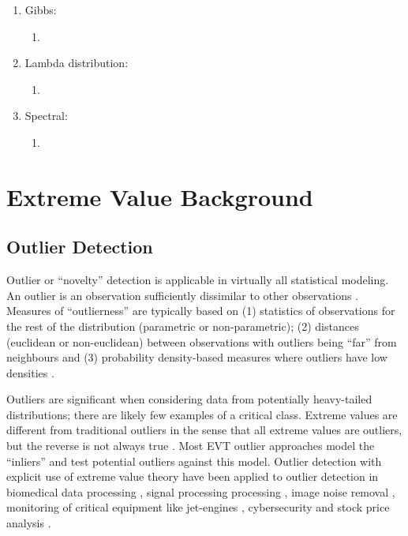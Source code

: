 \begin{enumerate}

    \item Gibbs:
          \begin{enumerate}
              \item \cite{barnett2015multivariate,silva2018multivariate,silva2018enhanced,arroyo2020iterative,madani2021enhanced}
          \end{enumerate}

    \item Lambda distribution:
          \begin{enumerate}
              \item \cite{hadavand2023spatial}
          \end{enumerate}

    \item Spectral:
          \begin{enumerate}
              \item \cite{lauzon2020calibration,lauzon2020sequential,lauzon2023joint}
          \end{enumerate}

\end{enumerate}


\FloatBarrier
\section{Extreme Value Background}
\label{sec:01evtreview}

\FloatBarrier
\subsection{Outlier Detection}
\label{subsec:01outlier}

Outlier or ``novelty'' detection is applicable in virtually all statistical modeling. An outlier is an observation sufficiently dissimilar to other observations \citep{barnett1984outliers}. Measures of ``outlierness'' are typically based on (1) statistics of observations for the rest of the distribution (parametric or non-parametric); (2) distances (euclidean or non-euclidean) between observations with outliers being ``far'' from neighbours and (3) probability density-based measures where outliers have low densities \citep{hodge2004survey}.

Outliers are significant when considering data from potentially heavy-tailed distributions; there are likely few examples of a critical class. Extreme values are different from traditional outliers in the sense that all extreme values are outliers, but the reverse is not always true \citep{aggarwal2016outlier}. Most EVT outlier approaches model the ``inliers'' and test potential outliers against this model. Outlier detection with explicit use of extreme value theory have been applied to outlier detection in biomedical data processing \citep{roberts2000extreme}, signal processing processing \citep{hazan2012extreme}, image noise removal \citep{roberts1999novelty}, monitoring of critical equipment like jet-engines \citep{clifton2014extending}, cybersecurity and stock price analysis \citep{siffer2017anomaly}.

